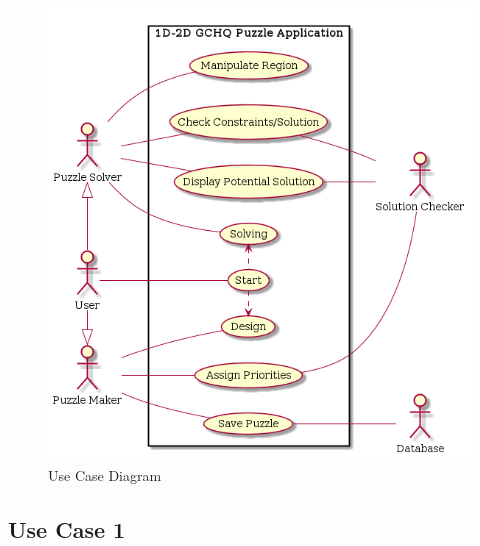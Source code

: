 \documentclass[12pt]{article}
\begin{document}
\begin{figure}[H]
\begin{center}
\includegraphics[scale=0.5]{usecasediagram}
\caption{Use Case Diagram}
\label{fig:use-case-diagram}
\end{center}
\end{figure}

\subsection{Use Case 1} \label{uc:1}
\end{document}
